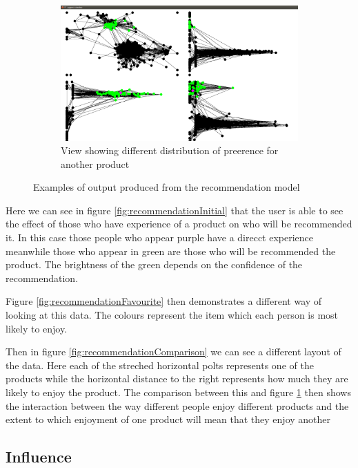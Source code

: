 \documentclass[12pt,a4paper]{article}
\begin{document}
\begin{figure}[htb]
\begin{subfigure}[b]{0.4\linewidth}
	\end{subfigure}
\quad
	\begin{subfigure}[b]{0.4\linewidth}
	\caption{View showing different distribution of preerence for another product}
	\label{fig:recommendationDifferent}
	\includegraphics[scale=0.1]{Recommendation4.png}
	\end{subfigure}
\caption{Examples of output produced from the recommendation model}
\label{fig:recommendation}
\end{figure}

Here we can see in figure \ref{fig:recommendationInitial} that the user is able to see the effect of those who have experience of a product on who will be recommended it. In this case those people who appear purple have a direcct experience meanwhile those who appear in green are those who will be recommended the product. The brightness of the green depends on the confidence of the recommendation.

Figure \ref{fig:recommendationFavourite} then demonstrates a different way of looking at this data. The colours represent the item which each person is most likely to enjoy.

Then in figure \ref{fig:recommendationComparison} we can see a different layout of the data. Here each of the streched horizontal polts represents one of the products while the horizontal distance to the right represents how much they are likely to enjoy the product. The comparison between this and figure \ref{fig:recommendationDifferent} then shows the interaction between the way different people enjoy different products and the extent to which enjoyment of one product will mean that they enjoy another

\subsection{Influence}
\end{document}
